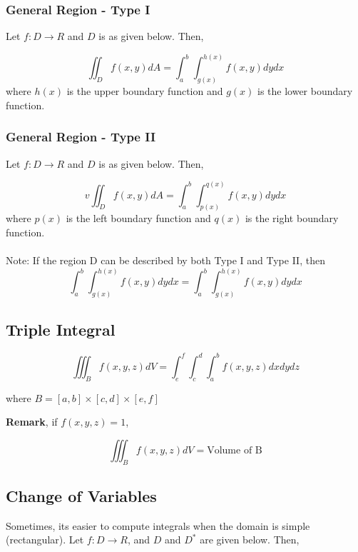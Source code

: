 \documentclass[11pt, oneside]{article}
\begin{document}
\subsubsection{General Region - Type I}
Let $f:D \rightarrow R$ and $D$ is as given below. Then, 

\begin{equation}
\iint_D f(x,y)dA = \int^b_a\int^{h(x)}_{g(x)} f(x,y)dydx
\end{equation}
where $h(x)$ is the upper boundary function and $g(x)$ is the lower boundary function.

\subsubsection{General Region - Type II}
Let $f:D \rightarrow R$ and $D$ is as given below. Then, 

\begin{equation}v
\iint_D f(x,y)dA = \int^b_a\int^{q(x)}_{p(x)} f(x,y)dydx
\end{equation}
where $p(x)$ is the left boundary function and $q(x)$ is the right boundary function.\\\\
Note: If the region D can be described by both Type I and Type II, then 
\begin{equation}
\int^b_a\int^{h(x)}_{g(x)} f(x,y)dydx = \int^b_a\int^{h(x)}_{g(x)} f(x,y)dydx
\end{equation}

\subsection{Triple Integral}
\begin{equation}
  \iiint_B f(x,y,z)dV = \int_e^f\int_c^d\int_a^b f(x,y,z)dxdydz
\end{equation}

where $B=[a,b]\times[c,d]\times[e,f]$

\textbf{Remark}, if $f(x,y,z) = 1$,

\begin{equation}
  \iiint_B f(x,y,z)dV = \text{Volume of B}
\end{equation}

\subsection{Change of Variables}
Sometimes, its easier to compute integrals when the domain is simple (rectangular). Let $f:D\rightarrow R$, and $D$ and $D^*$ are given below. Then,
\end{document}
